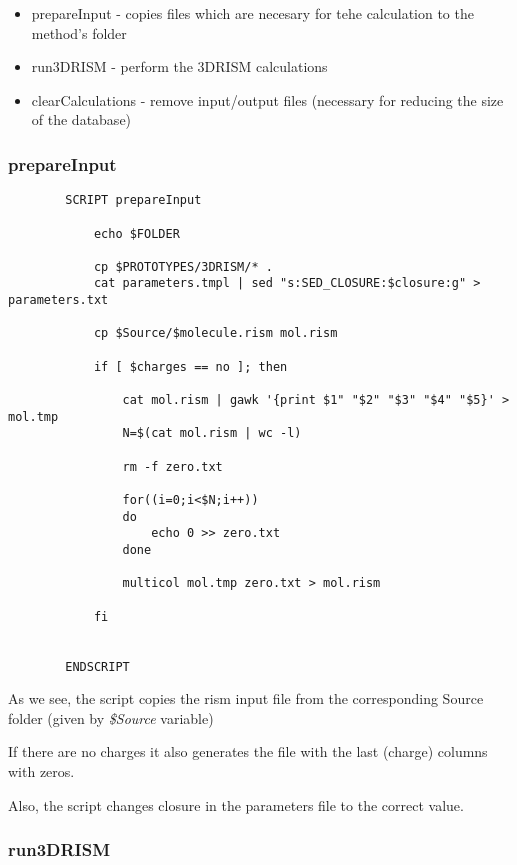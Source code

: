 \documentclass[12pt]{article}
\begin{document}
\begin{itemize}

\item prepareInput - copies files which are necesary for tehe calculation to the method's folder

\item run3DRISM - perform the 3DRISM calculations

\item clearCalculations - remove input/output files (necessary for reducing the size of the database)

\end{itemize}

\subsubsection{prepareInput}

\begin{verbatim}
		SCRIPT prepareInput

			echo $FOLDER

			cp $PROTOTYPES/3DRISM/* .
			cat parameters.tmpl | sed "s:SED_CLOSURE:$closure:g" > parameters.txt

			cp $Source/$molecule.rism mol.rism
			
			if [ $charges == no ]; then

				cat mol.rism | gawk '{print $1" "$2" "$3" "$4" "$5}' > mol.tmp
				N=$(cat mol.rism | wc -l)

				rm -f zero.txt			

				for((i=0;i<$N;i++))
				do
					echo 0 >> zero.txt
				done
				
				multicol mol.tmp zero.txt > mol.rism

			fi


		ENDSCRIPT 
\end{verbatim}

As we see, the script copies the rism input file from the corresponding Source folder (given by \emph{\$Source} variable)

If there are no charges it also generates the file with the last (charge) columns with zeros.

Also, the script changes closure in the parameters file to the correct value.

\subsubsection{run3DRISM}
\end{document}
